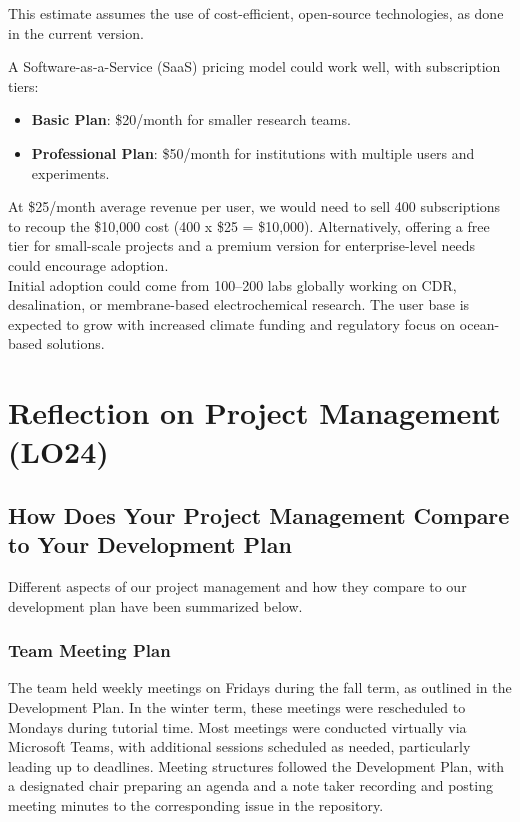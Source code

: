 \documentclass{article}
\begin{document}
This estimate assumes the use of cost-efficient, open-source technologies, as done in the current version.

A Software-as-a-Service (SaaS) pricing model could work well, with subscription tiers:
\begin{itemize}
    \item \textbf{Basic Plan}: \$20/month for smaller research teams.
    \item \textbf{Professional Plan}: \$50/month for institutions with multiple users and experiments.
\end{itemize}

At \$25/month average revenue per user, we would need to sell 400 subscriptions to recoup the \$10,000 cost 
(400 x \$25 = \$10,000). Alternatively, offering a free tier for small-scale projects and a premium version for 
enterprise-level needs could encourage adoption. \\

Initial adoption could come from 100–200 labs globally working on CDR, desalination, or membrane-based 
electrochemical research. The user base is expected to grow with increased climate funding and regulatory 
focus on ocean-based solutions.

\section{Reflection on Project Management (LO24)}

\subsection{How Does Your Project Management Compare to Your Development Plan}
Different aspects of our project management and how they compare to our development 
plan have been summarized below.

\subsubsection{Team Meeting Plan}
The team held weekly meetings on Fridays during the fall term, as outlined in
the Development Plan. In the winter term, these meetings were rescheduled to
Mondays during tutorial time. Most meetings were conducted virtually via
Microsoft Teams, with additional sessions scheduled as needed, particularly
leading up to deadlines. Meeting structures followed the Development Plan, with
a designated chair preparing an agenda and a note taker recording and posting
meeting minutes to the corresponding issue in the repository. \\
\end{document}
